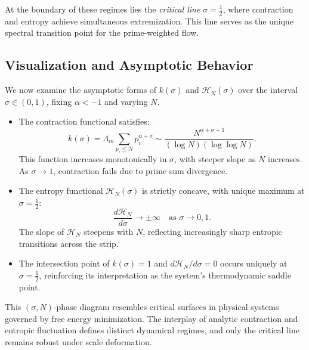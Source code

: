\documentclass[12pt]{article}
\begin{document}
At the boundary of these regimes lies the \emph{critical line} $\sigma = \tfrac{1}{2}$, where contraction and entropy achieve simultaneous extremization. This line serves as the unique spectral transition point for the prime-weighted flow.

\subsection{Visualization and Asymptotic Behavior}

We now examine the asymptotic forms of $k(\sigma)$ and $\mathcal{H}_N(\sigma)$ over the interval $\sigma \in (0,1)$, fixing $\alpha < -1$ and varying $N$.

\begin{itemize}
    \item The contraction functional satisfies:
    \[
    k(\sigma) = \Lambda_m \sum_{p_i \le N} p_i^{\alpha + \sigma} 
    \sim \frac{N^{\alpha + \sigma + 1}}{(\log N)(\log \log N)}.
    \]
    This function increases monotonically in $\sigma$, with steeper slope as $N$ increases. As $\sigma \to 1$, contraction fails due to prime sum divergence.

    \item The entropy functional $\mathcal{H}_N(\sigma)$ is strictly concave, with unique maximum at $\sigma = \tfrac{1}{2}$:
    \[
    \frac{d\mathcal{H}_N}{d\sigma} \to \pm \infty \quad \text{as } \sigma \to 0, 1.
    \]
    The slope of $\mathcal{H}_N$ steepens with $N$, reflecting increasingly sharp entropic transitions across the strip.

    \item The intersection point of $k(\sigma) = 1$ and $d\mathcal{H}_N/d\sigma = 0$ occurs uniquely at $\sigma = \tfrac{1}{2}$, reinforcing its interpretation as the system’s thermodynamic saddle point.
\end{itemize}

\medskip

This $(\sigma, N)$-phase diagram resembles critical surfaces in physical systems governed by free energy minimization. The interplay of analytic contraction and entropic fluctuation defines distinct dynamical regimes, and only the critical line remains robust under scale deformation.
\end{document}
